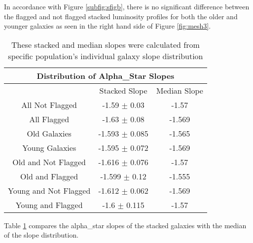 \documentclass{article}
\begin{document}
In accordance with Figure \ref{subfig:sfigb}, there is no significant difference between the flagged and not flagged stacked luminosity profiles for both the older and younger galaxies as seen in the right hand side of Figure \ref{fig:mesh3}. 

\begin{table}[h!]
\centering
\begin{tabular}{ ||c|c|c|| }
\hline
\multicolumn{3}{||c||}{Distribution of Alpha\_Star Slopes}\\
\hline\hline
   & Stacked Slope & Median Slope \\
\hline
All Not Flagged & -1.59 $\pm$ 0.03 & -1.57\\
\hline
All Flagged & -1.63 $\pm$ 0.08 & -1.569\\
\hline
Old Galaxies & -1.593 $\pm$ 0.085 &-1.565 \\
\hline
Young Galaxies &-1.595 $\pm$ 0.072 & -1.569\\
\hline
Old and Not Flagged & -1.616 $\pm$ 0.076 & -1.57\\
\hline
Old and Flagged & -1.599 $\pm$ 0.12 & -1.555\\
\hline
Young and Not Flagged & -1.612 $\pm$ 0.062 & -1.569\\
\hline
Young and Flagged & -1.6 $\pm$ 0.115 & -1.57\\

\hline
\end{tabular}
\caption{These stacked and median slopes were calculated from specific population's individual galaxy slope distribution}
\label{table:2}
\end{table}

Table \ref{table:2} compares the alpha\_star slopes of the stacked galaxies with the median of the slope distribution. 
\end{document}
